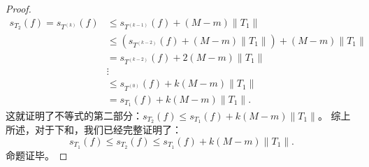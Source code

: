 \begin{proof}
\[
\begin{aligned} s_{T_2}(f) = s_{T^{(k)}}(f) &\leq s_{T^{(k-1)}}(f) + (M - m) \|T_1\| \\ &\leq (s_{T^{(k-2)}}(f) + (M - m) \|T_1\|) + (M - m) \|T_1\| \\ &= s_{T^{(k-2)}}(f) + 2(M - m) \|T_1\| \\ &\vdots \\ &\leq s_{T^{(0)}}(f) + k(M - m) \|T_1\| \\ &= s_{T_1}(f) + k(M - m) \|T_1\|. \end{aligned}
\]
这就证明了不等式的第二部分：$s_{T_2}(f) \leq s_{T_1}(f) + k(M-m)\|T_1\|$。 综上所述，对于下和，我们已经完整证明了： \[
s_{T_1}(f) \leq s_{T_2}(f) \leq s_{T_1}(f) + k(M-m)\|T_1\|.
\] 命题证毕。

\end{proof}

